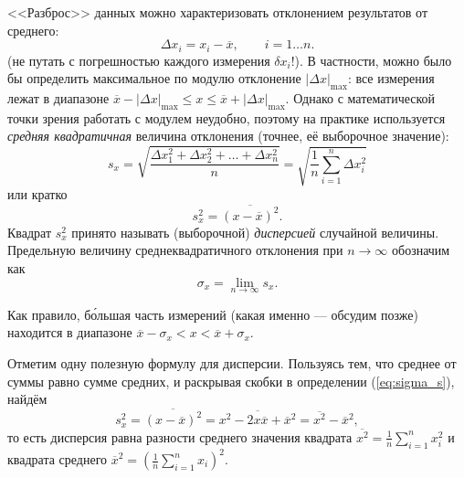 \documentclass[10pt]{article}
\begin{document}

<<Разброс>> данных можно характеризовать
отклонением результатов от среднего:
\[
\Delta x_{i}=x_{i}-\overline{x},\qquad i=1\ldots n.
\]
(не путать с погрешностью каждого измерения $\delta x_{i}$!). В частности,
можно было бы определить максимальное по модулю отклонение $\left|\Delta x\right|_{\mathrm{max}}$:
все измерения лежат в диапазоне $\overline{x}-\left|\Delta x\right|_{\mathrm{max}}\le x\le\overline{x}+\left|\Delta x\right|_{\mathrm{max}}$.
Однако с математической точки зрения работать с модулем неудобно,
поэтому на практике используется \emph{средняя квадратичная} величина
отклонения (точнее, её выборочное значение):
\begin{equation}
s_{x}=\sqrt{\frac{\Delta x_{1}^{2}+\Delta x_{2}^{2}+\ldots+\Delta x_{n}^{2}}{n}}=\sqrt{\frac{1}{n}\sum\limits _{i=1}^{n}\Delta x_{i}^{2}}\label{eq:sigma}
\end{equation}
или кратко
\begin{equation}
\boxed{s_{x}^{2}=\overline{\left(x-\overline{x}\right)^{2}}}.\label{eq:sigma_s}
\end{equation}
Квадрат $s_{x}^{2}$ принято называть (выборочной) \emph{дисперсией}
случайной величины. Предельную величину среднеквадратичного отклонения
при $n\to\infty$ обозначим как
\[
\sigma_{x}=\lim\limits _{n\to\infty}s_{x}.
\]

Как правило, б\'ольшая часть измерений (какая именно ---
обсудим позже) находится в диапазоне $\overline{x}-\sigma_{x}<x<\overline{x}+\sigma_{x}.$

{\footnotesize{}Отметим одну полезную формулу для дисперсии. Пользуясь
тем, что среднее от суммы равно сумме средних, и раскрывая скобки
в определении (\ref{eq:sigma_s}), найдём
\begin{equation}
s_{x}^{2}=\overline{\left(x-\overline{x}\right)^{2}}=\overline{x^{2}-2x\overline{x}+\overline{x}^{2}}=\overline{x^{2}}-\overline{x}^{2},\label{eq:sigma_x2}
\end{equation}
то есть дисперсия равна разности среднего значения квадрата $\overline{x^{2}}=\frac{1}{n}\sum\limits _{i=1}^{n}x_{i}^{2}$
и квадрата среднего $\overline{x}^{2}=\left(\frac{1}{n}\sum\limits _{i=1}^{n}x_{i}\right)^{2}$.}{\footnotesize\par}
\end{document}
